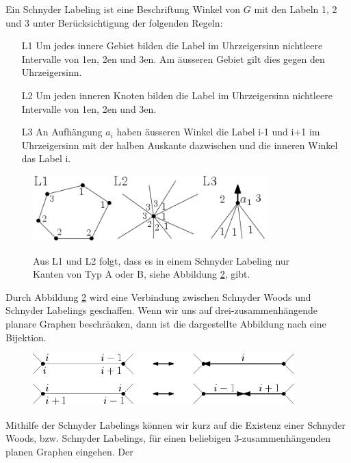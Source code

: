 \begin{definition}
Ein Schnyder Labeling ist eine Beschriftung Winkel von $G$ mit den Labeln 1, 2 und 3 unter Berücksichtigung der folgenden Regeln:
\begin{itemize}
\item[L1] Um jedes innere Gebiet bilden die Label im Uhrzeigersinn nichtleere Intervalle von 1en, 2en und 3en. Am äusseren Gebiet gilt dies gegen den Uhrzeigersinn.
\item[L2] Um jeden inneren Knoten bilden die Label im Uhrzeigersinn nichtleere Intervalle von 1en, 2en und 3en.
\item[L3] An Aufhängung $a_i$ haben äusseren Winkel die Label i-1 und i+1 im Uhrzeigersinn mit der halben Auskante dazwischen und die inneren Winkel das Label i.
\end{itemize} 
\end{definition}

\begin{figure}[h]
	\centering
  \includegraphics[width=0.8\textwidth]{schnyder_label_def.png}
	\label{10_example}
	\caption{Aus L1 und L2 folgt, dass es in einem Schnyder Labeling nur Kanten von Typ A oder B,  siehe Abbildung \ref{schnyder_bij}, gibt.}
\end{figure}

Durch Abbildung \ref{schnyder_bij} wird eine Verbindung zwischen Schnyder Woods und Schnyder Labelings geschaffen. Wenn wir uns auf drei-zusammenhängende planare Graphen beschränken, dann ist die dargestellte Abbildung nach \cite[Theorem 2.3]{felsner04} eine Bijektion.

\begin{figure}[h]
	\centering
  \includegraphics[width=0.9\textwidth]{schnyder_bij.png}
	\label{schnyder_bij}
	\caption{}
\end{figure}

Mithilfe der Schnyder Labelings können wir kurz auf die Existenz einer Schnyder Woods, bzw. Schnyder Labelings, für einen beliebigen 3-zusammenhängenden planen Graphen eingehen. Der 

